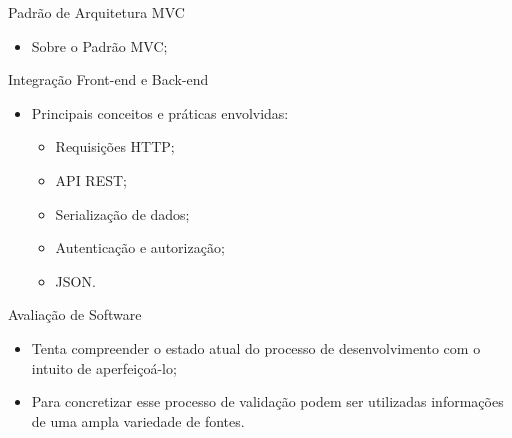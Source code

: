 \begin{frame}{Padrão de Arquitetura MVC}
    \begin{itemize}
        \item Sobre o Padrão MVC; \vspace{0.5cm}
    \end{itemize}
\end{frame}

\begin{frame}{Integração Front-end e Back-end}
    \begin{itemize}
        \item Principais conceitos e práticas envolvidas: \vspace{0.5cm}
              \begin{itemize}
                  \item Requisições HTTP; \vspace{0.5cm}
                  \item API REST; \vspace{0.5cm}
                  \item Serialização de dados; \vspace{0.5cm}
                  \item Autenticação e autorização; \vspace{0.5cm}
                  \item JSON. \vspace{0.5cm}
              \end{itemize}
    \end{itemize}
\end{frame}

\begin{frame}{Avaliação de Software}
    \begin{itemize}
        \item Tenta compreender o estado atual do processo de desenvolvimento com o intuito de aperfeiçoá-lo; \vspace{0.5cm}
        \item Para concretizar esse processo de validação podem ser utilizadas informações de uma ampla variedade de fontes. \vspace{0.5cm}
    \end{itemize}
\end{frame}